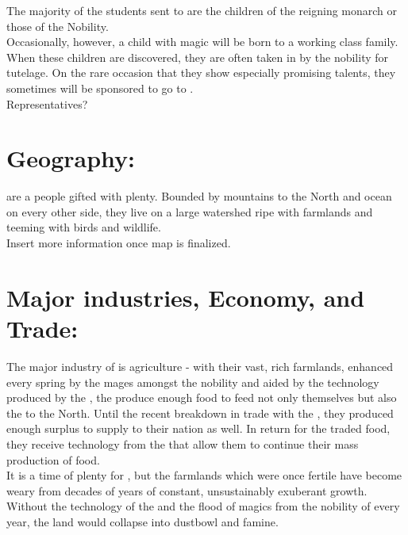 \documentclass[blue]{GL2020}
\begin{document}
The majority of the students sent to \pSchool{} are the children of the reigning monarch or those of the Nobility.\\

Occasionally, however, a child with magic will be born to a working class family.  When these children are discovered, they are often taken in by the nobility for tutelage.  On the rare occasion that they show especially promising talents, they sometimes will be sponsored to go to \pSchool{}.\\

Representatives?\\

\section{Geography:}

\pSunCh{} are a people gifted with plenty.  Bounded by mountains to the North and ocean on every other side, they live on a large watershed ripe with farmlands and teeming with birds and wildlife. \\ 

Insert more information once map is finalized.\\

\section{Major industries, Economy, and Trade:}

The major industry of \pSun{} is agriculture - with their vast, rich farmlands, enhanced every spring by the mages amongst the nobility and aided by the technology produced by the \pCreators{}, the \pSunCh{} produce enough food to feed not only themselves but also the \pCreators{} to the North.  Until the recent breakdown in trade with the \pVikings{}, they produced enough surplus to supply to their nation as well.  In return for the traded food, they receive technology from the \pCreators{} that allow them to continue their mass production of food.\\

It is a time of plenty for \pSunCh{}, but the farmlands which were once fertile have become weary from decades of years of constant, unsustainably exuberant growth.  Without the technology of the \pCreators{} and the flood of magics from the nobility of \pSun{} every year, the land would collapse into dustbowl and famine.\\
\end{document}
